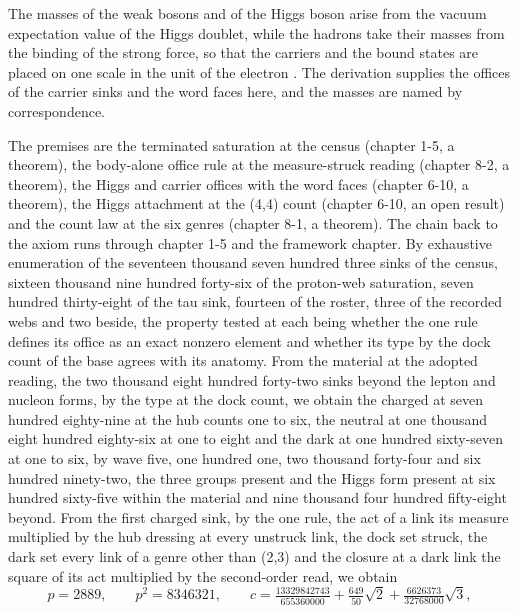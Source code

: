 \begin{chbridge}
The masses of the weak bosons and of the Higgs boson arise from the vacuum expectation value of the Higgs doublet, while the hadrons take their masses from the binding of the strong force, so that the carriers and the bound states are placed on one scale in the unit of the electron \cite{Weinberg1967,GellMann1964}. The derivation supplies the offices of the carrier sinks and the word faces here, and the masses are named by correspondence.
\end{chbridge}
\begin{chproof}
The premises are the terminated saturation at the census (chapter 1-5, a theorem), the body-alone office rule at the measure-struck reading (chapter 8-2, a theorem), the Higgs and carrier offices with the word faces (chapter 6-10, a theorem), the Higgs attachment at the (4,4) count (chapter 6-10, an open result) and the count law at the six genres (chapter 8-1, a theorem). The chain back to the axiom runs through chapter 1-5 and the framework chapter. By exhaustive enumeration of the seventeen thousand seven hundred three sinks of the census, sixteen thousand nine hundred forty-six of the proton-web saturation, seven hundred thirty-eight of the tau sink, fourteen of the roster, three of the recorded webs and two beside, the property tested at each being whether the one rule defines its office as an exact nonzero element and whether its type by the dock count of the base agrees with its anatomy. From the material at the adopted reading, the two thousand eight hundred forty-two sinks beyond the lepton and nucleon forms, by the type at the dock count, we obtain the charged at seven hundred eighty-nine at the hub counts one to six, the neutral at one thousand eight hundred eighty-six at one to eight and the dark at one hundred sixty-seven at one to six, by wave five, one hundred one, two thousand forty-four and six hundred ninety-two, the three groups present and the Higgs form present at six hundred sixty-five within the material and nine thousand four hundred fifty-eight beyond. From the first charged sink, by the one rule, the act of a link its measure multiplied by the hub dressing at every unstruck link, the dock set struck, the dark set every link of a genre other than (2,3) and the closure at a dark link the square of its act multiplied by the second-order read, we obtain
\begin{equation}
p = 2889 , \qquad p^{2} = 8346321 , \qquad c = \tfrac{13329842743}{655360000} + \tfrac{649}{50}\sqrt{2} + \tfrac{6626373}{32768000}\sqrt{3} ,

\end{equation}
\end{chproof}
